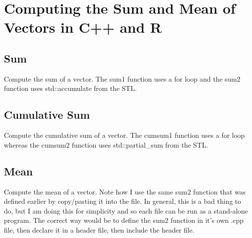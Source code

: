 \chapter{Computing the Sum and Mean of Vectors in C++ and R}

\section{Sum}
Compute the sum of a vector.  The sum1 function uses a for loop and the sum2 function uses std::accumulate from the STL.

\lstset{language=C++}


\section{Cumulative Sum}
Compute the cumulative sum of a vector. The cumsum1 function uses a for loop whereas the cumsum2 function uses std::partial\_sum from the STL.

\lstset{language=C++}


\section{Mean}
Compute the mean of a vector. Note how I use the same sum2 function that was defined earlier by copy/pasting it into the file. In general, this is a bad thing to do, but I am doing this for simplicity and so each file can be run as a stand-alone program. The correct way would be to define the sum2 function in it's own .cpp file, then declare it in a header file, then include the header file.

\lstset{language=C++}
